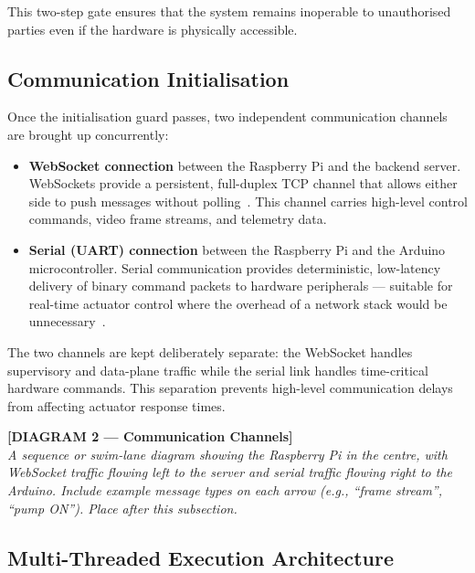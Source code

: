 This two-step gate ensures that the system remains inoperable to
unauthorised parties even if the hardware is physically accessible.
 
\subsection{Communication Initialisation}
 
Once the initialisation guard passes, two independent communication
channels are brought up concurrently:
 
\begin{itemize}
    \item \textbf{WebSocket connection} between the Raspberry Pi and
          the backend server. WebSockets provide a persistent,
          full-duplex TCP channel that allows either side to push
          messages without polling~\cite{fette2011websocket}. This
          channel carries high-level control commands, video frame
          streams, and telemetry data.
 
    \item \textbf{Serial (UART) connection} between the Raspberry Pi
          and the Arduino microcontroller. Serial communication
          provides deterministic, low-latency delivery of binary
          command packets to hardware peripherals — suitable for
          real-time actuator control where the overhead of a
          network stack would be unnecessary~\cite{axelson2007serial}.
\end{itemize}
 
The two channels are kept deliberately separate: the WebSocket handles
supervisory and data-plane traffic while the serial link handles
time-critical hardware commands. This separation prevents high-level
communication delays from affecting actuator response times.
 
\bigskip
\noindent\textbf{[DIAGRAM 2 — Communication Channels]}\\
\textit{A sequence or swim-lane diagram showing the Raspberry Pi in
the centre, with WebSocket traffic flowing left to the server and
serial traffic flowing right to the Arduino. Include example message
types on each arrow (e.g., ``frame stream'', ``pump ON''). Place
after this subsection.}
\bigskip
 
\subsection{Multi-Threaded Execution Architecture}
 
